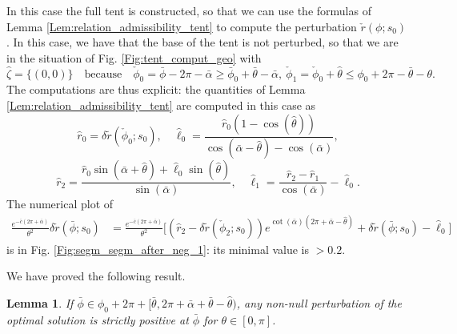 \documentclass[reqno]{amsart}
\theoremstyle{definition} \newtheorem{definition}{Definition}[section]
\theoremstyle{definition} \newtheorem{remark}[definition]{Remark}
\theoremstyle{plain} \newtheorem{lemma}[definition]{Lemma}
\theoremstyle{plain} \newtheorem{proposition}[definition]{Proposition}
\theoremstyle{plain} \newtheorem{theorem}[definition]{Theorem}
\theoremstyle{plain} \newtheorem{corollary}[definition]{Corollary}
\theoremstyle{definition} \newtheorem{example}[definition]{Example}
\theoremstyle{plain} \newtheorem{claim}[clai]{Claim}
\theoremstyle{definition} \newtheorem{assumption}[definition]{Assumption}
\theoremstyle{definition} \newtheorem{observation}[definition]{Observation}
\newcommand{\1}{\mathbbm 1}
\numberwithin{equation}{section} %
\theoremstyle{plain} \newtheorem*{theorem*}{Theorem}
\theoremstyle{plain} \newtheorem{mthm}[maintheorem]{Main Theorem}
\theoremstyle{plain} \newtheorem*{mthm*}{Main Theorem}
\theoremstyle{plain} \newtheorem*{conjecture*}{Conjecture}
\theoremstyle{plain} \newtheorem{conjecture}[definition]{Conjecture}
\theoremstyle{plain} \newtheorem*{problem*}{Problem}
\begin{document}
In this case the full tent is constructed, so that we can use the formulas of Lemma \ref{Lem:relation_admissibility_tent} to compute the perturbation $\check r(\phi;s_0)$. In this case, we have that the base of the tent is not perturbed, so that we are in the situation of Fig. \ref{Fig:tent_comput_geo} with
\begin{equation*}
\hat \zeta = \{(0,0)\} \quad \text{because} \quad \check \phi_0 = \bar \phi - 2\pi - \bar \alpha \geq \bar \phi_0 + \bar \theta - \bar \alpha, \ \check \phi_1 = \check \phi_0 + \hat \theta \leq \phi_0 + 2\pi - \bar \theta - \theta.
\end{equation*}
The computations are thus explicit: the quantities of Lemma \ref{Lem:relation_admissibility_tent} are computed in this case as
\begin{equation*}
\hat r_0 = \delta \tilde r(\check \phi_0;s_0), \quad \hat \ell_0 = \frac{\hat r_0 (1 - \cos(\hat \theta))}{\cos(\bar \alpha - \hat \theta) - \cos(\bar \alpha)},
\end{equation*}
\begin{equation*}
\hat r_2 = \frac{\hat r_0 \sin(\bar \alpha + \hat \theta) + \hat \ell_0 \sin(\hat \theta)}{\sin(\bar \alpha)}, \quad \hat \ell_1 = \frac{\hat r_2 - \hat r_1}{\cos(\bar \alpha)} - \hat \ell_0.
\end{equation*}
The numerical plot of
\begin{align*}
\frac{e^{-\bar c(2\pi + \bar \alpha)}}{\theta^2} \delta \check r(\bar \phi;s_0) &= \frac{e^{-\bar c(2\pi + \bar \alpha)}}{\theta^2}  \bigg [ (\hat r_2 - \delta \tilde r(\check \phi_2;s_0)) e^{\cot(\bar \alpha)(2\pi + \bar \alpha - \hat \theta)} + \delta \tilde r(\bar \phi;s_0) - \hat \ell_0 \bigg] %
\end{align*}
is in Fig. \ref{Fig:segm_segm_after_neg_1}: its minimal value is $> 0.2$.

We have proved the following result.

\begin{lemma}
\label{Lem:segm_segm_3_case}
If $\bar \phi \in \phi_0 + 2\pi + [\bar \theta,2\pi + \bar \alpha + \bar \theta - \hat \theta)$, any non-null perturbation of the optimal solution is strictly positive at $\bar \phi$ for $\theta \in [0,\pi]$.
\end{lemma}
\end{document}
